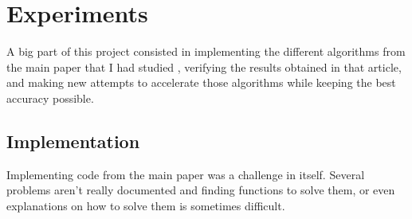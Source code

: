 \documentclass{article}
\theoremstyle{definition}
\begin{document}
\section{Experiments}
A big part of this project consisted in implementing the different algorithms from the main paper that I had studied \cite{vishwanathan_graph_2010}, verifying the results obtained in that article, and making new attempts to accelerate those algorithms while keeping the best accuracy possible.
\subsection{Implementation}
Implementing code from the main paper was a challenge in itself. Several problems aren't really documented and finding functions to solve them, or even explanations on how to solve them is sometimes difficult.
\end{document}
